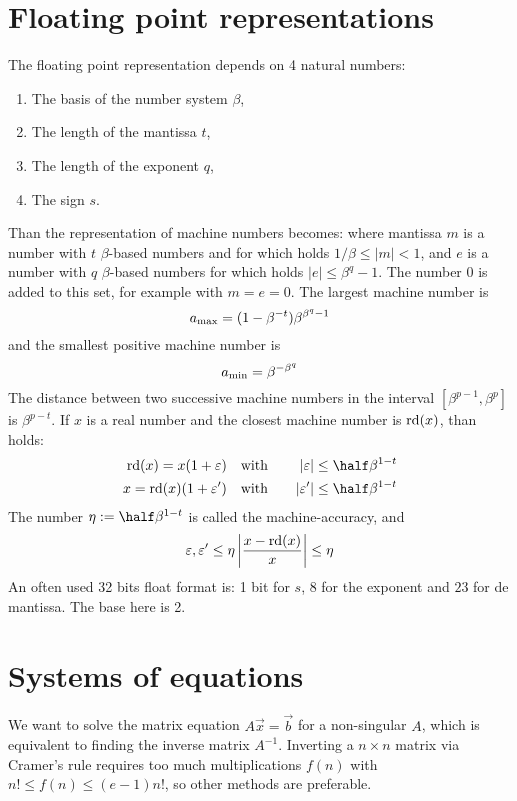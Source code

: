 \section{Floating point representations}
The floating point representation depends on 4 natural numbers:
\begin{enumerate}
\item The basis of the number system $\beta$,
\item The length of the mantissa $t$,
\item The length of the exponent $q$,
\item The sign $s$.
\end{enumerate}
Than the representation of machine numbers becomes: 
where mantissa $m$ is a number with $t$ $\beta$-based numbers and for which holds
$1/\beta\leq|m|<1$, and $e$ is a number with $q$ $\beta$-based numbers for which
holds $|e|\leq\beta^q-1$. The number 0 is added to this set, for example with
$m=e=0$. The largest machine number is
\[
a_{\rm max}=(1-\beta^{-t})\beta^{\beta^q-1}
\]
and the smallest positive machine number is
\[
a_{\rm min}=\beta^{-\beta^q}
\]
The distance between two successive machine numbers in the interval
$[\beta^{p-1},\beta^p]$ is $\beta^{p-t}$. If $x$ is a real number and the
closest machine number is ${\rm rd}(x)$, than holds:
\begin{eqnarray*}
{\rm rd}(x)=x(1+\varepsilon) &~~~\mbox{with}~~~&|\varepsilon|\leq\half\beta^{1-t}\\
x={\rm rd}(x)(1+\varepsilon')&~~~\mbox{with}~~~&|\varepsilon'|\leq\half\beta^{1-t}
\end{eqnarray*}
The number $\eta:=\half\beta^{1-t}$ is called the machine-accuracy, and
\[
\varepsilon,\varepsilon'\leq\eta\left|\frac{x-{\rm rd}(x)}{x}\right|\leq\eta
\]
An often used 32 bits float format is: 1 bit for $s$, 8 for the exponent
and $23$ for de mantissa. The base here is 2.

\section{Systems of equations}
We want to solve the matrix equation $A\vec{x}=\vec{b}$ for a non-singular
$A$, which is equivalent to finding the inverse matrix $A^{-1}$. Inverting
a $n\times n$ matrix via Cramer's rule requires too much multiplications
$f(n)$ with $n!\leq f(n)\leq (e-1)n!$, so other methods are preferable.

